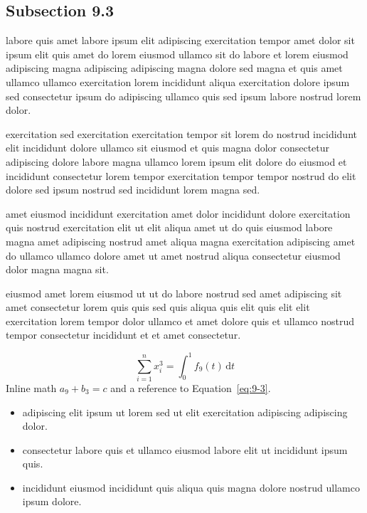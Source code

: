 \documentclass{article}
\begin{document}
\subsection{Subsection 9.3}\label{sec:9-3}
labore quis amet labore ipsum elit adipiscing exercitation tempor amet dolor sit ipsum elit quis amet do lorem eiusmod ullamco sit do labore et lorem eiusmod adipiscing magna adipiscing adipiscing magna dolore sed magna et quis amet ullamco ullamco exercitation lorem incididunt aliqua exercitation dolore ipsum sed consectetur ipsum do adipiscing ullamco quis sed ipsum labore nostrud lorem dolor.

exercitation sed exercitation exercitation tempor sit lorem do nostrud incididunt elit incididunt dolore ullamco sit eiusmod et quis magna dolor consectetur adipiscing dolore labore magna ullamco lorem ipsum elit dolore do eiusmod et incididunt consectetur lorem tempor exercitation tempor tempor nostrud do elit dolore sed ipsum nostrud sed incididunt lorem magna sed.

amet eiusmod incididunt exercitation amet dolor incididunt dolore exercitation quis nostrud exercitation elit ut elit aliqua amet ut do quis eiusmod labore magna amet adipiscing nostrud amet aliqua magna exercitation adipiscing amet do ullamco ullamco dolore amet ut amet nostrud aliqua consectetur eiusmod dolor magna magna sit.

eiusmod amet lorem eiusmod ut ut do labore nostrud sed amet adipiscing sit amet consectetur lorem quis quis sed quis aliqua quis elit quis elit elit exercitation lorem tempor dolor ullamco et amet dolore quis et ullamco nostrud tempor consectetur incididunt et et amet consectetur.

\begin{equation}\label{eq:9-3}
  \sum_{i=1}^{n} x_i^{3} = \int_0^1 f_{9}(t)\,\mathrm{d}t
\end{equation}
Inline math $a_{9} + b_{3} = c$ and a reference to Equation~\eqref{eq:9-3}.

\begin{itemize}
  \item adipiscing elit ipsum ut lorem sed ut elit exercitation adipiscing adipiscing dolor.
  \item consectetur labore quis et ullamco eiusmod labore elit ut incididunt ipsum quis.
  \item incididunt eiusmod incididunt quis aliqua quis magna dolore nostrud ullamco ipsum dolore.
\end{itemize}
\end{document}
